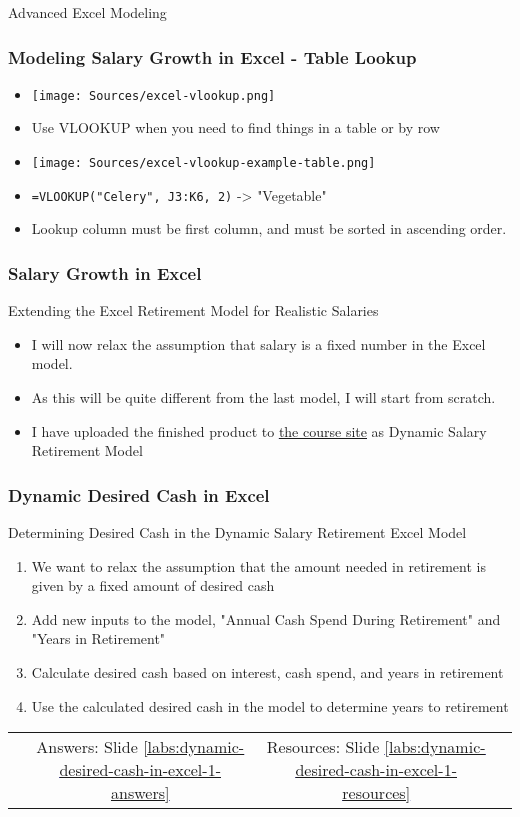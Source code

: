 \documentclass[handout, 11pt]{beamer}
\begin{document}
\begin{section}{Advanced Excel Modeling}
\begin{frame}
\frametitle{Modeling Salary Growth in Excel - Table Lookup}
\begin{itemize}
\item \texttt{[image: Sources/excel-vlookup.png]}
\vfill
\item Use VLOOKUP when you need to find things in a table or by row
\vfill
\item \texttt{[image: Sources/excel-vlookup-example-table.png]}
\vfill
\item \texttt{=VLOOKUP("Celery", J3:K6, 2)}
-> "Vegetable"
\vfill
\item Lookup column must be first column, and must be sorted in ascending order.
\end{itemize}
\end{frame}
\begin{frame}
\frametitle{Salary Growth in Excel}
{
\begin{block}{Extending the Excel Retirement Model for Realistic Salaries}
\begin{itemize}
\item I will now relax the assumption that salary is a fixed number in the Excel model.
\item As this will be quite different from the last model, I will start from scratch.
\item I have uploaded the finished product to
\textcolor{blue}{\underline{\href{https://nickderobertis.github.io/fin-model-course/}{the course site}}}
as Dynamic Salary Retirement Model
\end{itemize}
\end{block}
}
\end{frame}
\begin{frame}
\frametitle{Dynamic Desired Cash in Excel}
{
\begin{block}{Determining Desired Cash in the Dynamic Salary Retirement Excel Model}
\begin{enumerate}
\item We want to relax the assumption that the amount needed in retirement is given by a fixed amount of desired cash
\item Add new inputs to the model, "Annual Cash Spend During Retirement" and "Years in Retirement"
\item Calculate desired cash based on interest, cash spend, and years in retirement
\item Use the calculated desired cash in the model to determine years to retirement
\end{enumerate}
\vfill
\begin{tabular*}{\textwidth}{@{\extracolsep{\fill}}cccc}
\toprule
\hfill & Answers: Slide \textcolor{blue}{\underline{\ref{labs:dynamic-desired-cash-in-excel-1-answers}}} & Resources: Slide \textcolor{blue}{\underline{\ref{labs:dynamic-desired-cash-in-excel-1-resources}}} & \hfill\\


\end{tabular*}
\end{block}}
\end{frame}
\end{section}
\end{document}
